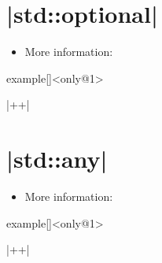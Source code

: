 \section{\CPP|std::optional|}
\begin{frame}[fragile]{\insertsectionhead}
    \vspace{-3mm}
    \begin{itemize}
        \item More information: 
    \end{itemize}
\end{frame}
\begin{frame}[fragile]{}
    \begin{varblock}{example}[\textwidth]{}<only@1>
        \begin{Cpp}
        \end{Cpp}
        \begin{Bash}[numbers=none]
            |++|
        \end{Bash}
    \end{varblock}
\end{frame}

\section{\CPP|std::any|}
\begin{frame}[fragile]{\insertsectionhead}
    \vspace{-3mm}
    \begin{itemize}
        \item More information: 
    \end{itemize}
\end{frame}
\begin{frame}[fragile]{}
    \begin{varblock}{example}[\textwidth]{}<only@1>
        \begin{Cpp}
        \end{Cpp}
        \begin{Bash}[numbers=none]
            |++|
        \end{Bash}
    \end{varblock}
\end{frame}

